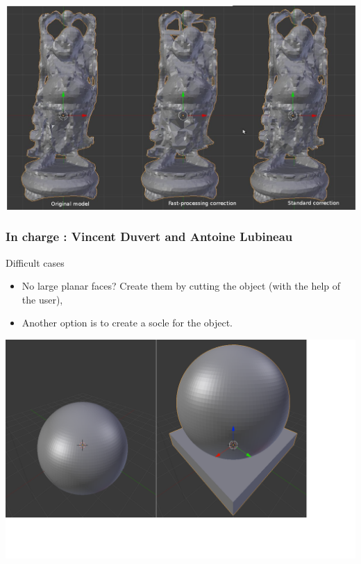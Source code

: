 \documentclass{beamer}
\begin{document}
\begin{frame}

    \includegraphics[width=1\textwidth]{damages}

\end{frame}

\begin{frame}
	\frametitle{In charge : Vincent Duvert and Antoine Lubineau} 
	\begin{block}{Difficult cases}
		\begin{itemize}
			\item No large planar faces? Create them by cutting the object (with the help of the user),
			\item Another option is to create a socle for the object.
		\end{itemize}
    \end{block}

	\begin{center}
		\includegraphics[width=.7\textwidth]{pf_socle}
	\end{center}
    
\end{frame}
\end{document}

